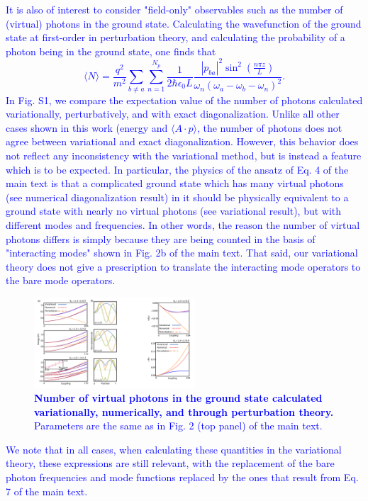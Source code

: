 \documentclass[aps,prb,onecolumn,preprint,
	groupedaddress,superscriptaddress,
	amsfonts,amssymb,amsmath,floatfix,
	citeautoscript]{revtex4-1}
\begin{document}
\textcolor{blue}{It is also of interest to consider "field-only" observables such as the number of (virtual) photons in the ground state. Calculating the wavefunction of the ground state at first-order in perturbation theory, and calculating the probability of a photon being in the ground state, one finds that 
\begin{equation}
\langle N \rangle = \frac{q^2}{m^2} \sum\limits_{b\neq a}\sum\limits_{n=1}^{N_p} \frac{1}{2\hbar\epsilon_0L}\frac{|p_{ba}|^2\sin^2\left(\frac{n\pi z}{L}\right)}{\omega_n(\omega_a-\omega_b-\omega_n)^2}.
\end{equation}
In Fig. S1, we compare the expectation value of the number of photons calculated variationally, perturbatively, and with exact diagonalization. Unlike all other cases shown in this work (energy and $\langle A\cdot p \rangle$, the number of photons does not agree between variational and exact diagonalization. However, this behavior does not reflect any inconsistency with the variational method, but is instead a feature which is to be expected. In particular, the physics of the ansatz of Eq. 4 of the main text is that a complicated ground state which has many virtual photons (see numerical diagonalization result) in it should be physically equivalent to a ground state with nearly no virtual photons (see variational result), but with different modes and frequencies. In other words, the reason the number of virtual photons differs is simply because they are being counted in the basis of "interacting modes" shown in Fig. 2b of the main text.   That said, our variational theory does not give a prescription to translate the interacting mode operators to the bare mode operators.}

\begin{figure}[t]
\includegraphics[width=6cm]{FigureS1.pdf}
\caption{\textcolor{blue}{\textbf{Number of virtual photons in the ground state calculated variationally, numerically, and through perturbation theory.} Parameters are the same as in Fig. 2 (top panel) of the main text.}}
\label{fig:ansatz}
\end{figure}

\textcolor{blue}{We note that in all cases, when calculating these quantities in the variational theory, these expressions are still relevant, with the replacement of the bare photon frequencies and mode functions replaced by the ones that result from Eq. 7 of the main text.}
\end{document}

